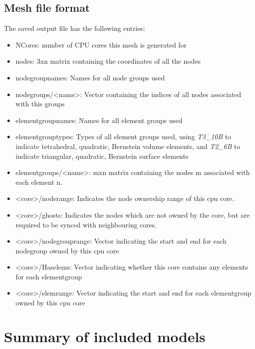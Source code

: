 \documentclass[3p]{elsarticle} %
\begin{document}
\subsection{Mesh file format}
The saved output file has the following entries:
\begin{itemize}
	\item NCores: number of CPU cores this mesh is generated for
	\item nodes: 3xn matrix containing the coordinates of all the nodes
	\item nodegroupnames: Names for all node groups used
	\item nodegroups/<name>: Vector containing the indices of all nodes associated with this groups
	\item elementgroupnames: Names for all element groups used
	\item elementgrouptypes: Types of all element groups used, using \textit{T3\_10B} to indicate tetrahedral, quadratic, Bernstein volume elements, and \textit{T2\_6B} to indicate triangular, quadratic, Bernstein surface elements
	\item elementgroups/<name>: mxn matrix containing the nodes m associated with each element n. 
	\item <core>/noderange: Indicates the node ownership range of this cpu core. 
	\item <core>/ghosts: Indicates the nodes which are not owned by the core, but are required to be synced with neighbouring cores. 
	\item <core>/nodegrouprange: Vector indicating the start and end for each nodegroup owned by this cpu core
	\item <core>/Haselems: Vector indicating whether this core contains any elements for each elementgroup
	\item <core>/elemrange: Vector indicating the start and end for each elementgroup owned by this cpu core
\end{itemize}

\section{Summary of included models}
\label{sec:models}
\end{document}
